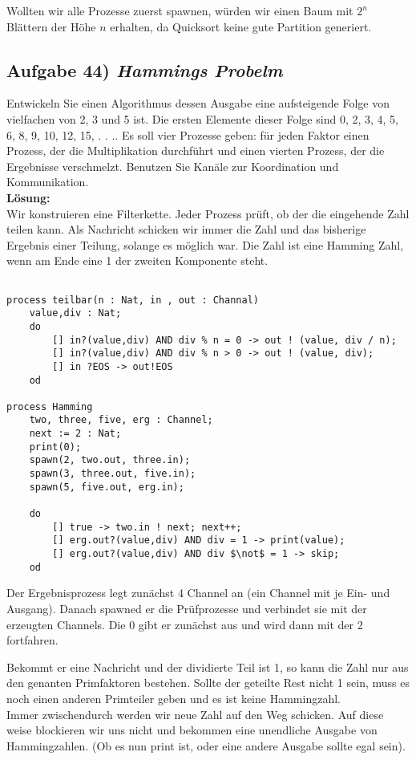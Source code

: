 \documentclass[ngerman,a4paper,11pt]{article}
\begin{document}
\begin{enumerate}[1.]
		Wollten wir alle Prozesse zuerst spawnen, würden wir einen Baum mit $2^n$ Blättern der Höhe $n$ erhalten,
		da Quicksort keine gute Partition generiert.
\end{enumerate}

\subsection*{Aufgabe 44) \mdseries\itshape Hammings Probelm}
	Entwickeln Sie einen Algorithmus dessen
	Ausgabe eine aufsteigende Folge von vielfachen von 2, 3 und 5 ist. Die ersten Elemente dieser
	Folge sind 0, 2, 3, 4, 5, 6, 8, 9, 10, 12, 15, . . .. Es soll vier Prozesse geben: für jeden Faktor einen
	Prozess, der die Multiplikation durchführt und einen vierten Prozess, der die Ergebnisse verschmelzt.
	Benutzen Sie Kanäle zur Koordination und Kommunikation.\\

\textbf{Lösung:}\\
	Wir konstruieren eine Filterkette. Jeder Prozess prüft, ob der die eingehende Zahl teilen kann.
	Als Nachricht schicken wir immer die Zahl und das bisherige Ergebnis einer Teilung, solange es möglich war.
	Die Zahl ist eine Hamming Zahl, wenn am Ende eine 1 der zweiten Komponente steht.\\

	\begin{lstlisting}

process teilbar(n : Nat, in , out : Channal)
	value,div : Nat;
	do
		[] in?(value,div) AND div % n = 0 -> out ! (value, div / n);
		[] in?(value,div) AND div % n > 0 -> out ! (value, div);
		[] in ?EOS -> out!EOS
	od

process Hamming
	two, three, five, erg : Channel;
	next := 2 : Nat;
	print(0);
	spawn(2, two.out, three.in);
	spawn(3, three.out, five.in);
	spawn(5, five.out, erg.in);

	do
		[] true -> two.in ! next; next++;
		[] erg.out?(value,div) AND div = 1 -> print(value);
		[] erg.out?(value,div) AND div $\not$ = 1 -> skip;
	od

	\end{lstlisting}

Der Ergebnisprozess legt zunächst 4 Channel an (ein Channel mit je Ein- und Ausgang). Danach spawned er die Prüfprozesse und
verbindet sie mit der erzeugten Channels. Die 0 gibt er zunächst aus und wird dann mit der 2 fortfahren.

Bekommt er eine Nachricht und der dividierte Teil ist 1, so kann die Zahl nur aus den genanten Primfaktoren bestehen. Sollte der geteilte Rest
nicht 1 sein, muss es noch einen anderen Primteiler geben und es ist keine Hammingzahl.\\
Immer zwischendurch werden wir neue Zahl auf den Weg schicken. Auf diese weise blockieren wir uns nicht und bekommen eine
unendliche Ausgabe von Hammingzahlen. (Ob es nun print ist, oder eine andere Ausgabe sollte egal sein).
\end{document}
